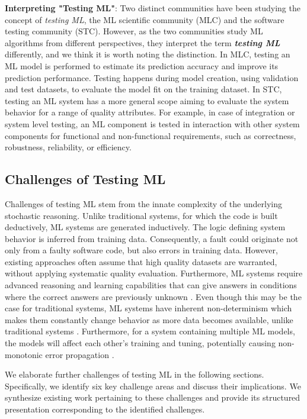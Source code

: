 \documentclass[letterpaper]{article} %
\begin{document}
\noindent \textbf{Interpreting "Testing ML"}: Two distinct communities have been studying the concept of \textit{testing ML}, the ML scientific community (MLC) and the software testing community (STC). However, as the two communities study ML algorithms from different perspectives, they interpret the term \textit{\textbf{testing ML}} differently, and we think it is worth noting the distinction. In MLC, testing an ML model is performed to estimate its prediction accuracy and improve its prediction performance. Testing happens during model creation, using validation and test datasets, to evaluate the model fit on the training dataset. In STC, testing an ML system has a more general scope aiming to evaluate the system behavior for a range of quality attributes. For example, in case of integration or system level testing, an ML component is tested in interaction with other system components for functional and non-functional requirements, such as correctness, robustness, reliability, or efficiency. 

\subsection{Challenges of Testing ML}
Challenges of testing ML stem from the innate complexity of the underlying stochastic reasoning. Unlike traditional systems, for which the code is built deductively, ML systems are generated inductively. The logic defining system behavior is inferred from training data. Consequently, a fault could originate not only from a faulty software code, but also errors in training data. However, existing approaches often assume that high quality datasets are warranted, without applying systematic quality evaluation.  
Furthermore, ML systems require advanced reasoning and learning capabilities that can give answers in conditions where the correct answers are previously unknown \cite{Murphy2007}. Even though this may be the case for traditional systems, ML systems have inherent non-determinism which makes them constantly change behavior as more data becomes available, unlike traditional systems \cite{8718214}. Furthermore, for a system containing multiple ML models, the models will affect each other's training and tuning, potentially causing non-monotonic error propagation \cite{Amershi}. 

We elaborate further challenges of testing ML in the following sections. Specifically, we identify six key challenge areas and discuss their implications. We synthesize existing work pertaining to these challenges and provide its structured presentation corresponding to the identified challenges. 
\end{document}
